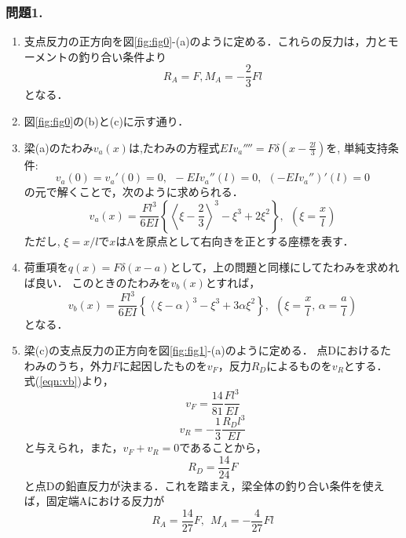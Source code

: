 ﻿\documentclass[10pt,a4j]{jarticle}
\begin{document}
\subsubsection*{問題1.}
\begin{enumerate}
\item
	支点反力の正方向を図\ref{fig:fig0}-(a)のように定める．これらの反力は，力とモーメントの釣り合い条件より
	\begin{equation}
		R_A=F, M_A=-\frac{2}{3}Fl 
		\label{eqn:re_forces}
	\end{equation}
	となる．
\item
	図\ref{fig:fig0}の(b)と(c)に示す通り．
\item
	梁(a)のたわみ$v_a(x)$は,たわみの方程式$EIv_a''''=F\delta\left(x-\frac{2l}{3}\right)$を,
単純支持条件:
\[
	v_a(0)=v_a'(0)=0, \ \ -EIv_a''(l)=0, \ \ (-EIv_a'')'(l)=0
\]
の元で解くことで，次のように求められる．
\begin{equation}
	v_a(x)=
	\frac{Fl^3}{6EI}
	\left\{ \left<\xi -\frac{2}{3}\right>^3-\xi^3+2\xi^2 \right\}, 
	\ \ \left(\xi=\frac{x}{l}\right)
	\label{eqn:va}
\end{equation}
ただし, $\xi=x/l$で$x$はAを原点として右向きを正とする座標を表す．
\item
荷重項を$q(x)=F\delta(x-a)$として，上の問題と同様にしてたわみを求めれば良い．
このときのたわみを$v_b(x)$とすれば，
\begin{equation}
	v_b(x)=
	\frac{Fl^3}{6EI}
	\left\{ \left<\xi -\alpha\right>^3-\xi^3+3\alpha\xi^2 \right\}, 
	\ \ \left(\xi=\frac{x}{l},\, \alpha=\frac{a}{l}\right)
	\label{eqn:vb}
\end{equation}
となる．
\item
梁(c)の支点反力の正方向を図\ref{fig:fig1}-(a)のように定める．
点Dにおけるたわみのうち，外力$F$に起因したものを$v_F$，反力$R_D$によるものを$v_R$とする．
式(\ref{eqn:vb})より，
\begin{equation}
	v_F=\frac{14}{81}\frac{Fl^3}{EI}
	\label{eqn:vF}
\end{equation}
\begin{equation}
	v_R=-\frac{1}{3}\frac{R_Dl^3}{EI}
	\label{eqn:vR}
\end{equation}
と与えられ，また，$v_F+v_R=0$であることから，
\begin{equation}
	R_D=\frac{14}{24}F
	\label{eqn:RB_c}
\end{equation}
と点Dの鉛直反力が決まる．これを踏まえ，梁全体の釣り合い条件を使えば，固定端Aにおける反力が
\begin{equation}
	R_A=\frac{14}{27}F, \ \ M_A=-\frac{4}{27}Fl

\end{equation}
\end{enumerate}
\end{document}
